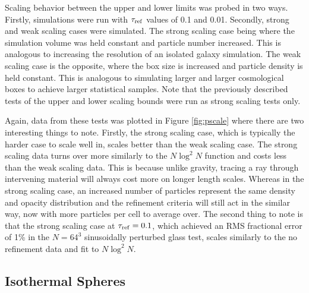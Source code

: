 \documentclass[fleq,usenatbib]{mnras}
\newcommand{\tr}{\tau_{\rm ref}}
\begin{document}
Scaling behavior between the upper and lower limits was probed in two ways. 
Firstly, simulations were run with $\tr$ values of 0.1 and 0.01. Secondly, 
strong and weak scaling cases were simulated. The strong scaling case being 
where the simulation volume was held constant and particle number increased. 
This is analogous to increasing the resolution of an isolated galaxy 
simulation. The weak scaling case is the opposite, where the box size is 
increased and particle density is held constant. This is analogous to 
simulating larger and larger cosmological boxes to achieve larger statistical 
samples. Note that the previously described tests of the upper and lower 
scaling bounds were run as strong scaling tests only.

Again, data from these tests was plotted in Figure \ref{fig:pscale} where 
there are two interesting things to note. Firstly, the strong scaling case, 
which is typically the harder case to scale well in, scales better than the 
weak scaling case. The strong scaling data turns over more similarly to the
$N\log^2{N}$ function and costs less than the weak scaling data. This is 
because unlike gravity, tracing a ray through intervening material will always 
cost more on longer length scales. Whereas in the strong scaling case, an 
increased number of particles represent the same density and opacity 
distribution and the refinement criteria will still act in the similar way, 
now with more particles per cell to average over. The second thing to note is 
that the strong scaling case at $\tr=0.1$, which achieved an RMS fractional 
error of 1\% in the $N=64^3$ sinusoidally perturbed glass test, scales 
similarly to the no refinement data and fit to $N\log^2{N}$. 

\subsection{Isothermal Spheres}
\end{document}
